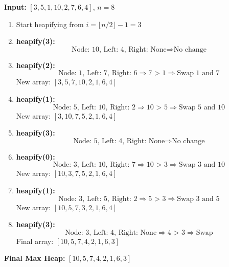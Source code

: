 \documentclass[14pt]{extarticle}
\begin{document}
\textbf{Input:} \([3, 5, 1, 10, 2, 7, 6, 4]\), \(n = 8\)

\begin{enumerate}[leftmargin=*]
    \item Start heapifying from \( i = \lfloor n/2 \rfloor - 1 = 3 \)
    \item \textbf{heapify(3):} 
        \[
        \text{Node: 10, Left: 4, Right: None} \Rightarrow \text{No change}
        \]
    \item \textbf{heapify(2):}
        \[
        \text{Node: 1, Left: 7, Right: 6} \Rightarrow \text{7 > 1} \Rightarrow \text{Swap 1 and 7}
        \]
        New array: \([3, 5, 7, 10, 2, 1, 6, 4]\)

    \item \textbf{heapify(1):}
        \[
        \text{Node: 5, Left: 10, Right: 2} \Rightarrow \text{10 > 5} \Rightarrow \text{Swap 5 and 10}
        \]
        New array: \([3, 10, 7, 5, 2, 1, 6, 4]\)

    \item \textbf{heapify(3):}
        \[
        \text{Node: 5, Left: 4, Right: None} \Rightarrow \text{No change}
        \]

    \item \textbf{heapify(0):}
        \[
        \text{Node: 3, Left: 10, Right: 7} \Rightarrow \text{10 > 3} \Rightarrow \text{Swap 3 and 10}
        \]
        New array: \([10, 3, 7, 5, 2, 1, 6, 4]\)

    \item \textbf{heapify(1):}
        \[
        \text{Node: 3, Left: 5, Right: 2} \Rightarrow \text{5 > 3} \Rightarrow \text{Swap 3 and 5}
        \]
        New array: \([10, 5, 7, 3, 2, 1, 6, 4]\)

    \item \textbf{heapify(3):}
        \[
        \text{Node: 3, Left: 4, Right: None} \Rightarrow \text{4 > 3} \Rightarrow \text{Swap}
        \]
        Final array: \([10, 5, 7, 4, 2, 1, 6, 3]\)
\end{enumerate}

\textbf{Final Max Heap:} \([10, 5, 7, 4, 2, 1, 6, 3]\)
\end{document}
